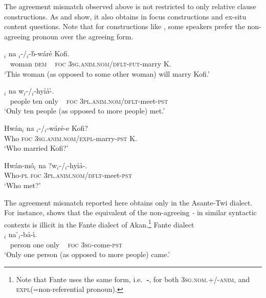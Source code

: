 \documentclass[output=paper]{LSP/langsci}
\begin{document}
\z
\z



The agreement mismatch observed above is not restricted to only relative clause constructions. As  and  show, it also obtains in focus constructions and  ex-situ content questions. Note that for constructions like , some speakers prefer the non-agreeing pronoun over the agreeing form. 
 

        

\ea\label{ex:korsah:18} 
\ea\label{ex:korsah:18a}
$_i$ na  \oor$_i$-/\eer$_i$-b\h \eer-w{\'{a}}r\h e Kofi.\\
 ~ woman \textsc{dem} ~ \textsc{foc} \textsc{3sg.anim.nom}/\textsc{dflt}-\textsc{fut}-marry K. \\
\glt  `This woman (as opposed to some other woman) will marry Kofi.'

\ex\label{ex:korsah:18b}
$_i$ na  w\oor$_i$-/\eer$_i$-hy\h i\h a-\h \eer.\\
 ~ people ten only ~ \textsc{foc} \textsc{3pl.anim.nom}/\textsc{dflt}-meet-\textsc{pst} \\
\glt  `Only ten people (as opposed to more people) met.'

\z
\z


\ea\label{ex:korsah:19} 
\ea\label{ex:korsah:19a}
\gll Hw{\'{a}}n$_i$ na  \oor$_i$-/\eer$_i$-w{\'{a}}r\h e-e Kofi?\\
Who \textsc{foc} \textsc{3sg.anim.nom}/\textsc{expl}-marry-\textsc{pst} K. \\
\glt  `Who married Kofi?'

\ex\label{ex:korsah:19b}
\gll Hw{\'{a}}n-m{\'{o}}$_i$ na ?w\oor$_i$-/\eer$_i$-hy\h i\h a-\eer.\\
Who-\textsc{pl} \textsc{foc} \textsc{3pl.anim.nom}/\textsc{dflt}-meet-\textsc{pst} \\
\glt  `Who met?'

\z
\z

The agreement mismatch reported here obtains only in the Asante-Twi dialect.
For instance,  shows that the equivalent of the non-agreeing \textit{\eer-} in similar syntactic contexts  is illicit in the Fante dialect of Akan.\footnote{Note that Fante uses the same  form, i.e.\ \textit{\textbf{\oor-}}, for both \textsc{3sg.nom.+/-anim}, and \textsc{expl}(=non-referential pronoun).} 
\ea\label{ex:korsah:20}  Fante dialect \\
\ea\label{ex:korsah:20a}
\gll [ Ny{\'{i}}p{\'{a}} k{\'{o}}r p{\'{\eer}} ]$_i$ na  \h \oor$_i$-b\h a-{\'{\i}}.\\
 ~ person one only ~ \textsc{foc} \textsc{3sg}-come-\textsc{pst}\\
\glt  `Only one person (as opposed to more people) came.'
\end{document}
